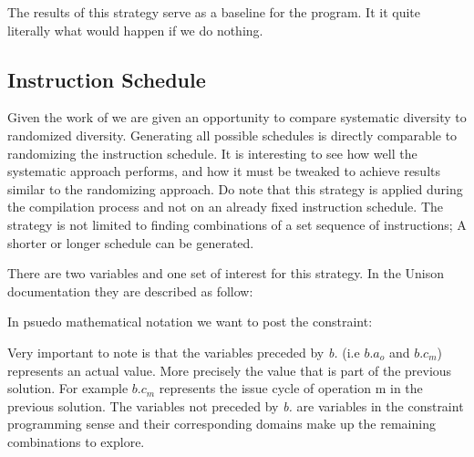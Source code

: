 The results of this strategy serve as a baseline for the program. It it quite literally
what would happen if we do nothing.

\subsection{Instruction Schedule}

Given the work of \textcite{large-scale-automated} we are given an opportunity to compare
systematic diversity to randomized diversity. Generating all possible schedules is directly
comparable to randomizing the instruction schedule. It is interesting to see how well
the systematic approach performs, and how it must be tweaked to achieve results similar
to the randomizing approach. Do note that this strategy is applied during the compilation
process and not on an already fixed instruction schedule. The strategy is not limited to
finding combinations of a set sequence of instructions; A shorter or longer schedule can
be generated.

There are two variables and one set of interest for this strategy. In the Unison documentation
they are described as follow:

\vspace{0.2cm}

\noindent{}

\vspace{0.2cm}


In psuedo mathematical notation we want to post the constraint:

\vspace{0.2cm}
\noindent{}
\vspace{0.2cm}

Very important to note is that the variables preceded by \textit{b.} (i.e $b.a_o$ and
$b.c_m$) represents an actual value. More precisely the value that is part of the previous
solution. For example $b.c_m$ represents the issue cycle of operation m in the previous
solution. The variables not preceded by \textit{b.} are variables in the constraint
programming sense and their corresponding domains make up the remaining combinations to
explore.

